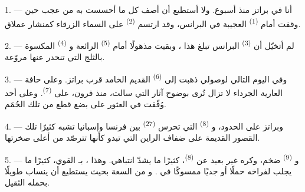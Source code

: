 
\VUsaut{4.0mm}
\VUsaut{3.0mm}

\VUsaut{3.0mm}

\VUsaut{3.0mm}

1. --- أنا في براتز منذ أسبوع. ولا أستطيع أن أصف كل ما أحسست به من عجب
حين وقفت أمام  \textsuperscript{(1)} العجيبة في البرانس،
وقد ارتسم  \textsuperscript{(2)} على السماء الزرقاء كمنشار عملاق.

2. --- لم أتخيّل أن  \textsuperscript{(3)} البرانس تبلغ هذا
، وبقيت مذهولًا أمام 
\textsuperscript{(5)} الرائعة و \textsuperscript{(4)} المكسوة بالثلج
التي تنحدر عنها  مروّعة.

\VUsaut{3.0mm}
\VUsaut{3.0mm}

3. --- وفي اليوم التالي لوصولي ذهبت إلى  \textsuperscript{(6)}
القديم الخامد قرب براتز. وعلى حافة  العارية الجرداء لا
تزال تُرى بوضوح آثار  التي سالت، منذ قرون، على
 \textsuperscript{(7)}. وعلى أحد  وُفّقت في
العثور على بضع قطع من تلك الحُمَم.

4. --- وبراتز على الحدود، و \textsuperscript{(8)} التي تحرس
 \textsuperscript{(27)} بين فرنسا وإسبانيا تشبه كثيرًا تلك القصور
القديمة على ضفاف الراين التي تبدو كأنها تترصّد  من أعلى
صخرتها.

5. --- و \textsuperscript{(9)} ضخم، وكره غير بعيد عن
 \textsuperscript{(8)}، كثيرًا ما يشدّ انتباهي. وهذا
، بـ القوي، كثيرًا ما يجلب لفراخه
حملًا أو جديًا ممسوكًا في . و من السعة بحيث
يستطيع أن ينساب طويلًا بحمله الثقيل.

\VUsaut{3.0mm}
\VUsaut{3.0mm}

